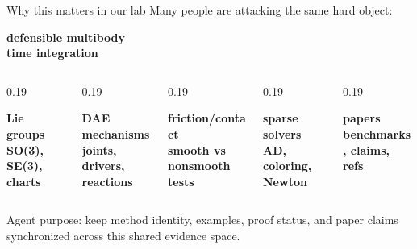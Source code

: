 \documentclass[aspectratio=169,10pt]{beamer}
\newcommand{\panel}[2]{%
  \begingroup
  \setlength{\fboxsep}{0.16cm}%
  \colorbox{LightBG}{\begin{minipage}{#1}#2\end{minipage}}%
  \endgroup
}
\newcommand{\colorpanel}[3]{%
  \begingroup
  \setlength{\fboxsep}{0.16cm}%
  \colorbox{#1}{\begin{minipage}{#2}#3\end{minipage}}%
  \endgroup
}
\begin{document}
\begin{frame}{Why this matters in our lab}
  \centering
  {\large Many people are attacking the same hard object:}

  \vspace{0.25cm}
  \colorpanel{LightBG}{0.55\linewidth}{\centering\Large\bfseries defensible multibody\\time integration}

  \vspace{0.35cm}
  \begin{columns}[T,onlytextwidth]
    \begin{column}{0.19\textwidth}
      \panel{\linewidth}{\centering\color{BlueAccent}\bfseries Lie groups\\\scriptsize SO(3), SE(3), charts}
    \end{column}
    \begin{column}{0.19\textwidth}
      \panel{\linewidth}{\centering\color{GreenAccent}\bfseries DAE mechanisms\\\scriptsize joints, drivers, reactions}
    \end{column}
    \begin{column}{0.19\textwidth}
      \panel{\linewidth}{\centering\color{OrangeAccent}\bfseries friction/contact\\\scriptsize smooth vs nonsmooth tests}
    \end{column}
    \begin{column}{0.19\textwidth}
      \panel{\linewidth}{\centering\color{PurpleAccent}\bfseries sparse solvers\\\scriptsize AD, coloring, Newton}
    \end{column}
    \begin{column}{0.19\textwidth}
      \panel{\linewidth}{\centering\color{UWRed}\bfseries papers\\\scriptsize benchmarks, claims, refs}
    \end{column}
  \end{columns}

  \vspace{0.5cm}
  \colorpanel{LightBG}{0.92\linewidth}{\centering
  Agent purpose: keep method identity, examples, proof status, and paper claims synchronized across this shared evidence space.}
\end{frame}
\end{document}
